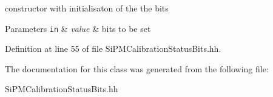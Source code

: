 constructor with initialisaton of the the bits 


\begin{DoxyParams}[1]{Parameters}
\mbox{\tt in}  & {\em value} & bits to be set \\
\hline
\end{DoxyParams}


Definition at line 55 of file Si\-P\-M\-Calibration\-Status\-Bits.\-hh.



The documentation for this class was generated from the following file\-:\begin{DoxyCompactItemize}
\item 
Si\-P\-M\-Calibration\-Status\-Bits.\-hh\end{DoxyCompactItemize}
